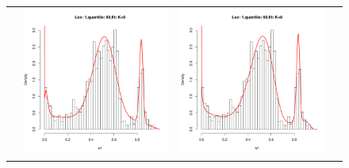 \begin{figure}[h]
\begin{tabular}{cccc}
&
\includegraphics[width=\textwidth/4]{../img/loc1/quantile90/fit_K5_BFGS.pdf}
&
\includegraphics[width=\textwidth/4]{../img/loc1/quantile90/fit_K6_BFGS.pdf}\\



\end{tabular}
\end{figure}
